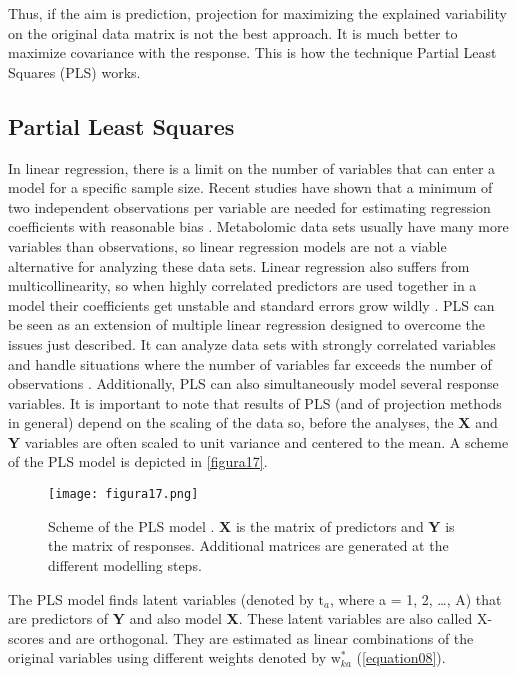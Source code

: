 Thus, if the aim is prediction, projection for maximizing the explained variability on the original data matrix is not the best approach. It is much better to maximize covariance with the response. This is how the technique Partial Least Squares (PLS) works.

\subsection{Partial Least Squares}
In linear regression, there is a limit on the number of variables that can enter a model for a specific sample size. Recent studies have shown that a minimum of two independent observations per variable are needed for estimating regression coefficients with reasonable bias \parencite{austin2015number}. Metabolomic data sets usually have many more variables than observations, so linear regression models are not a viable alternative for analyzing these data sets. Linear regression also suffers from multicollinearity, so when highly correlated predictors are used together in a model their coefficients get unstable and standard errors grow wildly \parencite{alin2010multicollinearity}. PLS can be seen as an extension of multiple linear regression designed to overcome the issues just described. It can analyze data sets with strongly correlated variables and handle situations where the number of variables far exceeds the number of observations \parencite{wold2001pls}. Additionally, PLS can also simultaneously model several response variables. It is important to note that results of PLS (and of projection methods in general) depend on the scaling of the data so, before the analyses, the \textbf{X} and \textbf{Y} variables are often scaled to unit variance and centered to the mean.
A scheme of the PLS model is depicted in \autoref{figura17}.

\begin{figure}[hbtp]
	\centering
\texttt{[image: figura17.png]}
\caption{Scheme of the PLS model \parencite{wold2001pls}. \textbf{X} is the matrix of predictors and \textbf{Y} is the matrix of responses. Additional matrices are generated at the different modelling steps.}
\label{figura17}
\end{figure}

The PLS model finds latent variables (denoted by $\text{t}_a$, where a = 1, 2, \dots, A) that are predictors of \textbf{Y} and also model \textbf{X}. These latent variables are also called X-scores and are orthogonal. They are estimated as linear combinations of the original variables using different weights denoted by $\text{w}^*_{ka}$ (\autoref{equation08}). 

